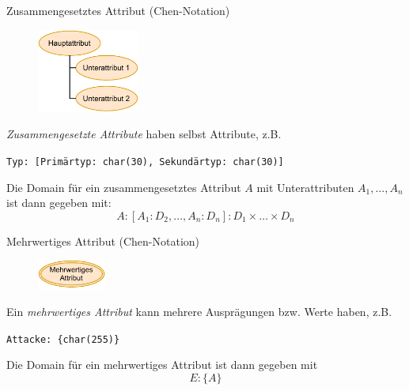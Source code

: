 \begin{defi}{Zusammengesetztes Attribut (Chen-Notation)}
    \begin{figure}
        \begin{center}
            \includegraphics[width=0.3\textwidth]{includes/figures/definition_entity_relationship_model_attribute_combined_alt.pdf}
        \end{center}
    \end{figure}
    \emph{Zusammengesetzte Attribute} haben selbst Attribute, z.B.
    \begin{center}
        \texttt{Typ: [Primärtyp: char(30), Sekundärtyp: char(30)]}
    \end{center}

    Die Domain für ein zusammengesetztes Attribut $A$ mit Unterattributen $A_1, \ldots, A_n$ ist dann gegeben mit:
    \[
        A: [A_1 : D_2, \ldots, A_n:D_n]: D_1 \times \ldots \times D_n
    \]
\end{defi}

\begin{defi}{Mehrwertiges Attribut (Chen-Notation)}
    \begin{figure}
        \begin{center}
            \includegraphics[width=0.2\textwidth]{includes/figures/definition_entity_relationship_model_attribute_multivalue.pdf}
        \end{center}
    \end{figure}
    Ein \emph{mehrwertiges Attribut} kann mehrere Ausprägungen bzw. Werte haben, z.B.
    \begin{center}
        \texttt{Attacke: \{char(255)\}}
    \end{center}

    Die Domain für ein mehrwertiges Attribut ist dann gegeben mit
    \[
        E : \{A\}
    \]
\end{defi}

